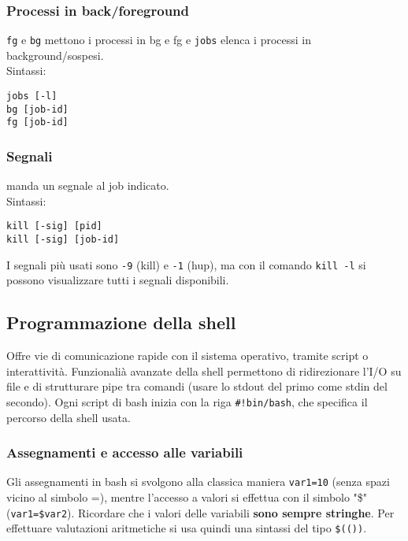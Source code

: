 \documentclass[a4paper, 10pt]{article}
\begin{document}
\subsubsection{Processi in back/foreground} \verb|fg| e \verb|bg| mettono i processi in bg e fg e \verb|jobs| elenca i processi in background/sospesi.\\
Sintassi:
\begin{verbatim}
jobs [-l]
bg [job-id]
fg [job-id]
\end{verbatim}

\subsubsection{Segnali} manda un segnale al job indicato. \\
Sintassi:
\begin{verbatim}
kill [-sig] [pid]
kill [-sig] [job-id]
\end{verbatim}
I segnali più usati sono \verb|-9| (kill) e \verb|-1| (hup), ma con il comando \verb|kill -l| si possono visualizzare tutti i segnali disponibili.

\subsection{Programmazione della shell}
Offre vie di comunicazione rapide con il sistema operativo, tramite script o interattività. Funzionalià avanzate della shell permettono di ridirezionare l'I/O su file e di strutturare pipe tra comandi (usare lo stdout del primo come stdin del secondo).
Ogni script di bash inizia con la riga \verb|#!bin/bash|, che specifica il percorso della shell usata.

\subsubsection{Assegnamenti e accesso alle variabili}
Gli assegnamenti in bash si svolgono alla classica maniera \verb|var1=10| (senza spazi vicino al simbolo =), mentre l'accesso a valori si effettua con il simbolo "\$" (\verb|var1=$var2|). Ricordare che i valori delle variabili \textbf{sono sempre stringhe}. Per effettuare valutazioni aritmetiche si usa quindi una sintassi del tipo \verb|$(())|.
\end{document}

